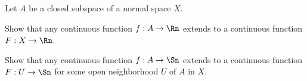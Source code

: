 Let $A$ be a closed subspace of a normal space $X$.
\begin{alist}
\item Show that any continuous function $f:A\rightarrow \Rn$ extends to a
continuous function $F:X\rightarrow \Rn$.
\item Show that any continuous function $f:A\rightarrow \Sn$ extends
to a continuous function $F:U\rightarrow \Sn$ for some open
neighborhood $U$ of $A$ in $X$.
\end{alist}
